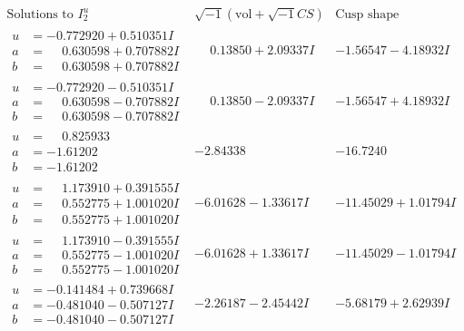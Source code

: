 \documentclass[1p]{elsarticle_modified}
\theoremstyle{definition}
\newcommand{\I}{\sqrt{-1}}
\begin{document}
$$\begin{array}{c|c|c}  
\text{Solutions to }I^u_{2}& \I (\text{vol} + \sqrt{-1}CS) & \text{Cusp shape}\\
 \hline 
\begin{aligned}
u &= -0.772920 + 0.510351 I \\
a &= \phantom{-}0.630598 + 0.707882 I \\
b &= \phantom{-}0.630598 + 0.707882 I\end{aligned}
 & \phantom{-}0.13850 + 2.09337 I & -1.56547 - 4.18932 I \\ \hline\begin{aligned}
u &= -0.772920 - 0.510351 I \\
a &= \phantom{-}0.630598 - 0.707882 I \\
b &= \phantom{-}0.630598 - 0.707882 I\end{aligned}
 & \phantom{-}0.13850 - 2.09337 I & -1.56547 + 4.18932 I \\ \hline\begin{aligned}
u &= \phantom{-}0.825933\phantom{ +0.000000I} \\
a &= -1.61202\phantom{ +0.000000I} \\
b &= -1.61202\phantom{ +0.000000I}\end{aligned}
 & -2.84338\phantom{ +0.000000I} & -16.7240\phantom{ +0.000000I} \\ \hline\begin{aligned}
u &= \phantom{-}1.173910 + 0.391555 I \\
a &= \phantom{-}0.552775 + 1.001020 I \\
b &= \phantom{-}0.552775 + 1.001020 I\end{aligned}
 & -6.01628 - 1.33617 I & -11.45029 + 1.01794 I \\ \hline\begin{aligned}
u &= \phantom{-}1.173910 - 0.391555 I \\
a &= \phantom{-}0.552775 - 1.001020 I \\
b &= \phantom{-}0.552775 - 1.001020 I\end{aligned}
 & -6.01628 + 1.33617 I & -11.45029 - 1.01794 I \\ \hline\begin{aligned}
u &= -0.141484 + 0.739668 I \\
a &= -0.481040 - 0.507127 I \\
b &= -0.481040 - 0.507127 I\end{aligned}
 & -2.26187 - 2.45442 I & -5.68179 + 2.62939 I \\ \hline\begin{aligned}

\end{aligned}
\end{array}$$
\end{document}
